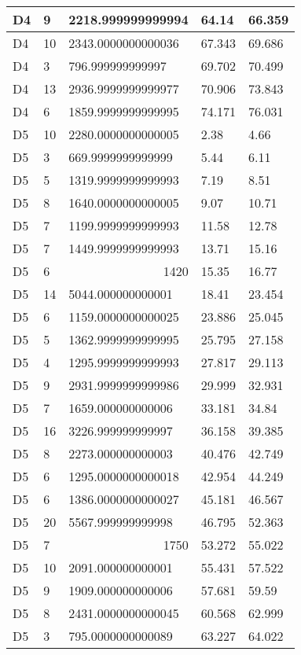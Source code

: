 \begin{longtable}{|l|l|l|l|l|}
D4 & 9 & 2218.999999999994 & 64.14 & 66.359 \\ \hline
D4 & 10 & 2343.0000000000036 & 67.343 & 69.686 \\ \hline
D4 & 3 & 796.999999999997 & 69.702 & 70.499 \\ \hline
D4 & 13 & 2936.9999999999977 & 70.906 & 73.843 \\ \hline
D4 & 6 & 1859.9999999999995 & 74.171 & 76.031 \\ \hline
D5 & 10 & 2280.0000000000005 & 2.38 & 4.66 \\ \hline
D5 & 3 & 669.9999999999999 & 5.44 & 6.11 \\ \hline
D5 & 5 & 1319.9999999999993 & 7.19 & 8.51 \\ \hline
D5 & 8 & 1640.0000000000005 & 9.07 & 10.71 \\ \hline
D5 & 7 & 1199.9999999999993 & 11.58 & 12.78 \\ \hline
D5 & 7 & 1449.9999999999993 & 13.71 & 15.16 \\ \hline
D5 & 6 & \multicolumn{1}{r|}{1420} & 15.35 & 16.77 \\ \hline
D5 & 14 & 5044.000000000001 & 18.41 & 23.454 \\ \hline
D5 & 6 & 1159.0000000000025 & 23.886 & 25.045 \\ \hline
D5 & 5 & 1362.9999999999995 & 25.795 & 27.158 \\ \hline
D5 & 4 & 1295.9999999999993 & 27.817 & 29.113 \\ \hline
D5 & 9 & 2931.9999999999986 & 29.999 & 32.931 \\ \hline
D5 & 7 & 1659.000000000006 & 33.181 & 34.84 \\ \hline
D5 & 16 & 3226.999999999997 & 36.158 & 39.385 \\ \hline
D5 & 8 & 2273.000000000003 & 40.476 & 42.749 \\ \hline
D5 & 6 & 1295.0000000000018 & 42.954 & 44.249 \\ \hline
D5 & 6 & 1386.0000000000027 & 45.181 & 46.567 \\ \hline
D5 & 20 & 5567.999999999998 & 46.795 & 52.363 \\ \hline
D5 & 7 & \multicolumn{1}{r|}{1750} & 53.272 & 55.022 \\ \hline
D5 & 10 & 2091.000000000001 & 55.431 & 57.522 \\ \hline
D5 & 9 & 1909.000000000006 & 57.681 & 59.59 \\ \hline
D5 & 8 & 2431.0000000000045 & 60.568 & 62.999 \\ \hline
D5 & 3 & 795.0000000000089 & 63.227 & 64.022 \\ \hline

\end{longtable}
